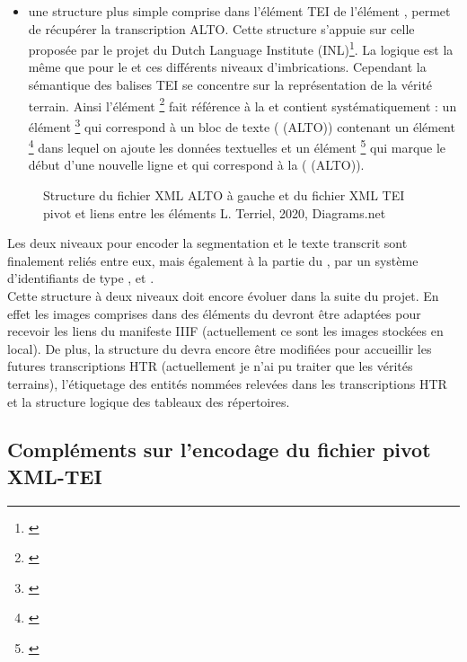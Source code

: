 \begin{itemize}
    \item une structure plus simple comprise dans l'élément TEI  de l'élément , permet de récupérer la transcription ALTO. Cette structure s'appuie sur celle proposée par le projet du Dutch Language Institute (INL)\footnote{\cite{dutch_language_institute_inl_alto2tei_nodate}}. La logique est la même que pour le  et ces différents niveaux d'imbrications. Cependant la sémantique des balises TEI se concentre sur la représentation de la vérité terrain. Ainsi l'élément \footnote{\cite{tei_tei_nodate-11}} fait référence à la  et contient systématiquement : un élément \footnote{\cite{tei_tei_nodate-10}} qui correspond à un bloc de texte ( (ALTO)) contenant un élément \footnote{\cite{tei_tei_nodate-24}} dans lequel on ajoute les données textuelles et un élément \footnote{\cite{tei_tei_nodate-25}} qui marque le début d'une nouvelle ligne et qui correspond à la ( (ALTO)).
\end{itemize}

\begin{figure}[h!]
    \centering
    \centerline{}
    \caption{Structure du fichier XML ALTO à gauche et du fichier XML TEI pivot et liens entre les éléments \textcopyright L. Terriel, 2020, Diagrams.net}
    \label{fig:structure_arbre_tei_alto}
\end{figure}
\newpage
Les deux niveaux pour encoder la segmentation et le texte transcrit sont finalement reliés entre eux, mais également à la partie du , par un système d'identifiants de type ,  et .\\

Cette structure à deux niveaux doit encore évoluer dans la suite du projet. En effet les images comprises dans des éléments  du  devront être adaptées pour recevoir les liens du manifeste IIIF (actuellement ce sont les images stockées en local). De plus, la structure du  devra encore être modifiées pour accueillir les futures transcriptions HTR (actuellement je n'ai pu traiter que les vérités terrains), l'étiquetage des entités nommées relevées dans les transcriptions HTR et la structure logique des tableaux des répertoires.
\newpage
\subsection{Compléments sur l'encodage du fichier pivot XML-TEI}

